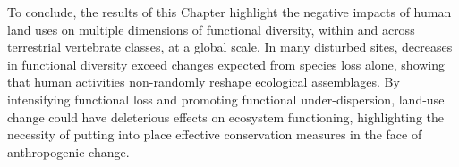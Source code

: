 To conclude, the results of this Chapter highlight the negative impacts of human land uses on multiple dimensions of functional diversity, within and across terrestrial vertebrate classes, at a global scale. In many disturbed sites, decreases in functional diversity exceed changes expected from species loss alone, showing that human activities non-randomly reshape ecological assemblages. By intensifying functional loss and promoting functional under-dispersion, land-use change could have deleterious effects on ecosystem functioning, highlighting the necessity of putting into place effective conservation measures in the face of anthropogenic change.